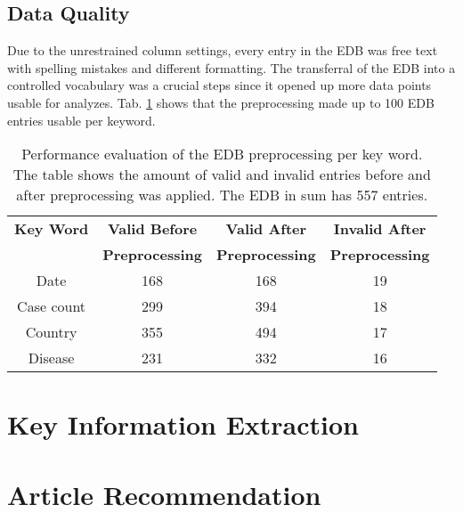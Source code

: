 \subsection{Data Quality}
Due to the unrestrained column settings, every entry in the EDB was free text with spelling mistakes and different formatting. The transferral of the EDB into a controlled vocabulary was a crucial steps since it opened up more data points usable for analyzes. Tab. \ref{table:preprocessing performance} shows that the preprocessing made up to 100 EDB entries usable per keyword.
\begin{table}
  \centering
  \caption{Performance evaluation of the EDB preprocessing per key word. The table shows the amount of valid and invalid entries before and after preprocessing was applied. The EDB in sum has 557 entries.  }
  \begin{tabular}{@{}cccc@{}}
    \toprule
    \textbf{Key Word} & \textbf{Valid Before} & \textbf{Valid After} & \textbf{Invalid After} \\
    & \textbf{Preprocessing} & \textbf{Preprocessing} & \textbf{Preprocessing} \\
    \midrule
    Date & 168 & 168 &  19 \\
    Case count & 299 & 394 &  18 \\
    Country & 355 & 494 &  17 \\
    Disease & 231 & 332 & 16 \\
    \bottomrule
  \end{tabular}
  \label{table:preprocessing performance}
\end{table}

\section{Key Information Extraction}
\section{Article Recommendation}
